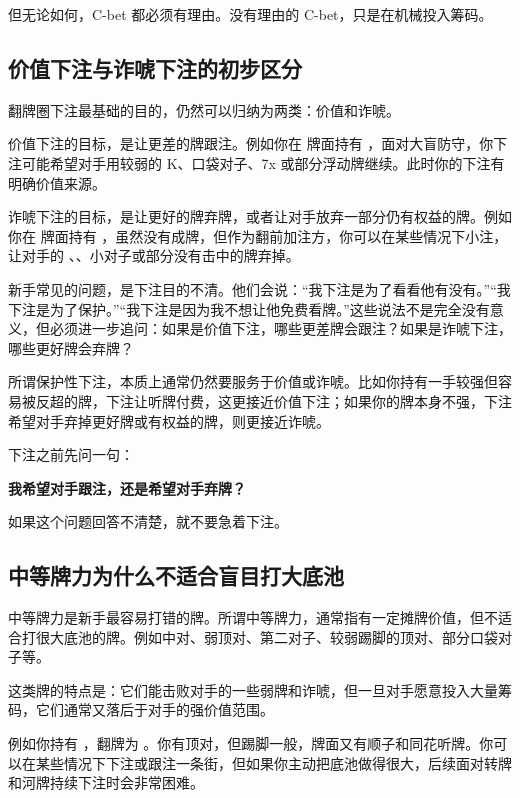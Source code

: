 但无论如何，C-bet 都必须有理由。没有理由的 C-bet，只是在机械投入筹码。

\subsection{价值下注与诈唬下注的初步区分}

翻牌圈下注最基础的目的，仍然可以归纳为两类：价值和诈唬。

价值下注的目标，是让更差的牌跟注。例如你在  牌面持有 ，面对大盲防守，你下注可能希望对手用较弱的 K、口袋对子、7x 或部分浮动牌继续。此时你的下注有明确价值来源。

诈唬下注的目标，是让更好的牌弃牌，或者让对手放弃一部分仍有权益的牌。例如你在  牌面持有 ，虽然没有成牌，但作为翻前加注方，你可以在某些情况下小注，让对手的 、、小对子或部分没有击中的牌弃掉。

新手常见的问题，是下注目的不清。他们会说：“我下注是为了看看他有没有。”“我下注是为了保护。”“我下注是因为我不想让他免费看牌。”这些说法不是完全没有意义，但必须进一步追问：如果是价值下注，哪些更差牌会跟注？如果是诈唬下注，哪些更好牌会弃牌？

所谓保护性下注，本质上通常仍然要服务于价值或诈唬。比如你持有一手较强但容易被反超的牌，下注让听牌付费，这更接近价值下注；如果你的牌本身不强，下注希望对手弃掉更好牌或有权益的牌，则更接近诈唬。

下注之前先问一句：

\begin{center}
\textbf{我希望对手跟注，还是希望对手弃牌？}
\end{center}

如果这个问题回答不清楚，就不要急着下注。

\subsection{中等牌力为什么不适合盲目打大底池}

中等牌力是新手最容易打错的牌。所谓中等牌力，通常指有一定摊牌价值，但不适合打很大底池的牌。例如中对、弱顶对、第二对子、较弱踢脚的顶对、部分口袋对子等。

这类牌的特点是：它们能击败对手的一些弱牌和诈唬，但一旦对手愿意投入大量筹码，它们通常又落后于对手的强价值范围。

例如你持有 ，翻牌为 。你有顶对，但踢脚一般，牌面又有顺子和同花听牌。你可以在某些情况下下注或跟注一条街，但如果你主动把底池做得很大，后续面对转牌和河牌持续下注时会非常困难。

